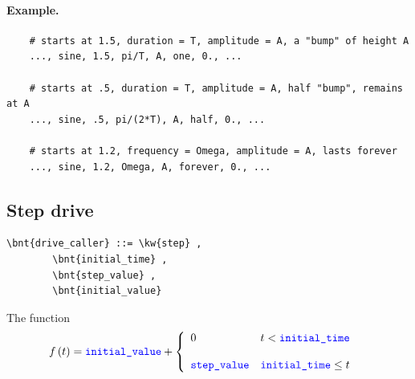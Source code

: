 \paragraph{Example.}
\begin{verbatim}
    # starts at 1.5, duration = T, amplitude = A, a "bump" of height A
    ..., sine, 1.5, pi/T, A, one, 0., ...

    # starts at .5, duration = T, amplitude = A, half "bump", remains at A
    ..., sine, .5, pi/(2*T), A, half, 0., ...

    # starts at 1.2, frequency = Omega, amplitude = A, lasts forever
    ..., sine, 1.2, Omega, A, forever, 0., ...
\end{verbatim}


\subsection{Step drive}
\begin{Verbatim}[commandchars=\\\{\}]
    \bnt{drive_caller} ::= \kw{step} ,
        \bnt{initial_time} , 
        \bnt{step_value} ,
        \bnt{initial_value}
\end{Verbatim}    
The function
\begin{align}
	f\plbr{t} &= \nt{initial\_value} %
	+ \lcubr{\matr{ll}{
		0 
			& t < \nt{initial\_time} \\
		\\
		\nt{step\_value}
			& \nt{initial\_time} \le t
	}}
\end{align}

